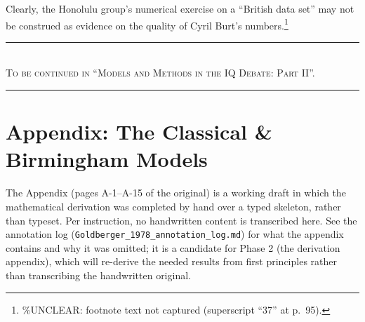 ﻿\documentclass[12pt]{article}
\begin{document}
Clearly, the Honolulu group's numerical exercise on a ``British data set'' may not be construed as evidence on the quality of Cyril Burt's numbers.\footnote{\%UNCLEAR: footnote text not captured (superscript ``37'' at p.\ 95).}

\begin{center}
\rule{0.5\textwidth}{0.4pt}\\[2pt]
\textsc{To be continued in ``Models and Methods in the IQ Debate: Part II''.}\\[2pt]
\rule{0.5\textwidth}{0.4pt}
\end{center}

\newpage
\appendix
\section*{Appendix: The Classical \& Birmingham Models}

The Appendix (pages A-1--A-15 of the original) is a working draft in which the mathematical derivation was completed by hand over a typed skeleton, rather than typeset. Per instruction, no handwritten content is transcribed here. See the annotation log (\texttt{Goldberger\_1978\_annotation\_log.md}) for what the appendix contains and why it was omitted; it is a candidate for Phase 2 (the derivation appendix), which will re-derive the needed results from first principles rather than transcribing the handwritten original.
\end{document}
